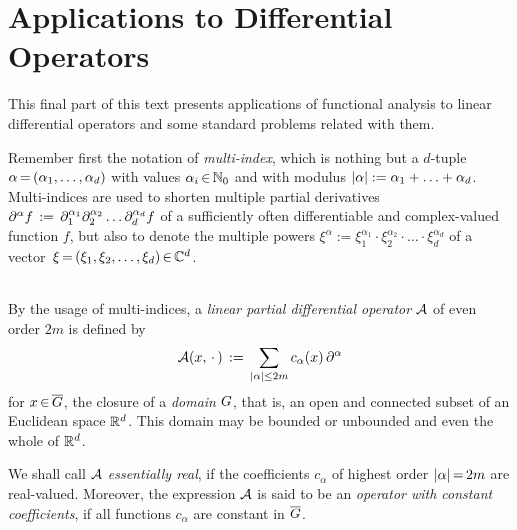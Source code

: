\documentclass[11pt,twoside]{article}
\begin{document}
\newpage
\thispagestyle{empty}
\part{Applications to Differential Operators}                                  %
This final part of this text presents applications of functional analysis
to linear differential operators and some standard problems
related with them.

\subparagraph{} %
Remember first the notation of \textit{multi-index},
which is nothing but a $d$-tuple $\alpha {\,=\,} (\alpha_1,\ldots,\alpha_d)$
with values $\alpha_i {\,\in\,} {\mathbb{N}}_0$
and with modulus $\abs{\alpha} := \alpha_1 + \ldots + \alpha_d$.
Multi-indices are used to shorten multiple partial derivatives
$
\partial^{\alpha} f \,:=\, \partial_1^{\alpha_1}
             \partial_2^{\alpha_2} \ldots
             \partial_d^{\alpha_d} f
$
of a sufficiently often differentiable and complex-valued function $f$,
but also to denote the multiple powers
$\xi^{\alpha} := \xi_1^{\alpha_1}
\cdot \xi_2^{\alpha_2} \cdot \ldots \cdot \xi_d^{\alpha_d}$
of a vector $\,\xi {\,=\,} (\xi_1,\xi_2,\ldots,\xi_d) {\,\in\,} {\mathbb{C}}^d$.

\paragraph{} %
By the usage of multi-indices,
a \textit{linear partial differential operator} ${\mathcal{A}}$ of even order $2m$
is defined by
\begin{equation}\label{XII_EVEN_ORDER_LPDO}
\A(x,\,\cdot\,) \eqdef
\sum_{\abs{\alpha} \leq 2m} c_{\alpha}(x) \, \PA
\end{equation}
for $x {\,\in\,} \overline{G}$,
the closure of a \textit{domain} $G$,
that is,
an open and connected subset of an Euclidean space ${\mathbb{R}}^d$.
This domain may be bounded or unbounded and even the whole of ${\mathbb{R}}^d$.

\subparagraph{} %
We shall call ${\mathcal{A}}$ \textit{essentially real},
if the coefficients $c_{\alpha}$ of highest order $\abs{\alpha} \eq 2m$
are real-valued.
Moreover,
the expression ${\mathcal{A}}$ is said to be
an \textit{operator with constant coefficients},
if all functions $c_{\alpha}$ are constant in $\overline{G}$.
\end{document}
